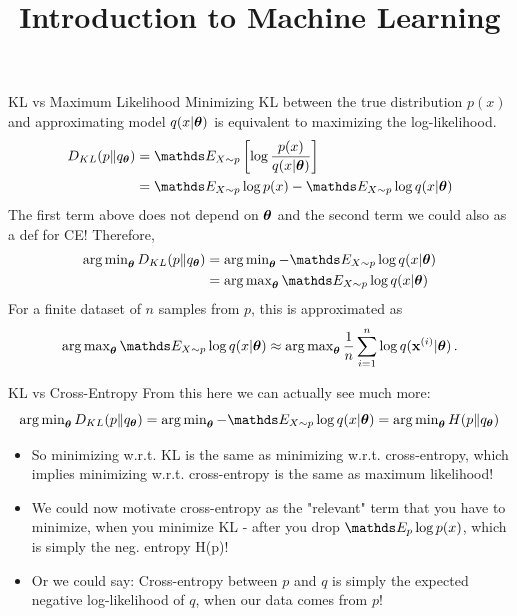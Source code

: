 \documentclass[11pt,compress,t,notes=noshow, xcolor=table]{beamer}
\title{Introduction to Machine Learning}
\date{}
\begin{document}



\begin{vbframe}{KL vs Maximum Likelihood}
Minimizing KL between the true distribution $p(x)$ and approximating model $q(x|\bm{\theta})$ is equivalent to maximizing the log-likelihood.
  \begin{align*}
    D_{KL}(p \| q_{\thetab}) &= \E_{X \sim p} \left[ \log \frac{p(x)}{q(x|\thetab)}\right] \\
     &= \E_{X \sim p} \log p(x) - \E_{X \sim p} \log q(x|\thetab)
  \end{align*}
  The first term above does not depend on $\bm{\theta}$ and the second term we could also as a def for CE! Therefore,
  \begin{align*}
    \argmin_{\thetab} D_{KL}(p \| q_{\thetab}) &= \argmin_{\thetab} -\E_{X \sim p} \log q(x|\thetab)\\ 
                                           &= \argmax_{\thetab} \E_{X \sim p} \log q(x|\thetab)
  \end{align*}
  For a finite dataset of $n$ samples from $p$, this is approximated as 
  $$\argmax_{\thetab} \E_{X \sim p} \log q(x|\thetab) \approx \argmax_{\thetab} \frac{1}{n} \sumin \log q(\xi|\thetab)\,.$$

\end{vbframe}

\begin{vbframe}{KL vs Cross-Entropy}
From this here we can actually see much more:
$$ \argmin_{\thetab} D_{KL}(p \| q_{\thetab}) = \argmin_{\thetab} -\E_{X \sim p} \log q(x|\thetab) = \argmin_{\thetab} H(p \| q_{\thetab}) $$
  \begin{itemize}
    \item So minimizing w.r.t. KL is the same as minimizing w.r.t. cross-entropy, which implies minimizing w.r.t. cross-entropy is the same as maximum likelihood!
    \item We could now motivate cross-entropy as the "relevant" term that you have to minimize, when you minimize KL - after you drop $\E_p \log p(x)$, which is simply the neg. entropy H(p)!
    \item Or we could say: Cross-entropy between $p$ and $q$ is simply the expected negative log-likelihood of $q$, when our data comes from $p$!
  \end{itemize}
\end{vbframe}
\end{document}
